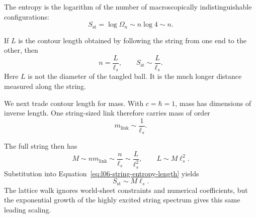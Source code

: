 The entropy is the logarithm of the number of macroscopically indistinguishable configurations:
\begin{equation}
S_{\mathrm{st}}=\log\Omega_n\sim n\log4\sim n.
\label{eq:l06-string-entropy-n}
\end{equation}

\begin{classroomqa}
\end{classroomqa}

If \(L\) is the contour length obtained by following the string from one end to the other, then
\begin{equation}
n=\frac{L}{\ell_s},
\qquad
S_{\mathrm{st}}\sim\frac{L}{\ell_s}.
\label{eq:l06-string-entropy-length}
\end{equation}
Here \(L\) is not the diameter of the tangled ball. It is the much longer distance measured along the string.

We next trade contour length for mass. With \(c=\hbar=1\), mass has dimensions of inverse length. One string-sized link therefore carries mass of order
\begin{equation}
m_{\mathrm{link}}\sim\frac{1}{\ell_s}.
\label{eq:l06-link-mass}
\end{equation}

\begin{classroomqa}
\end{classroomqa}

The full string then has
\begin{equation}
M\sim n m_{\mathrm{link}}
\sim\frac{n}{\ell_s}
\sim\frac{L}{\ell_s^2},
\qquad
L\sim M\ell_s^2.
\label{eq:l06-string-mass}
\end{equation}
Substitution into Equation~\eqref{eq:l06-string-entropy-length} yields
\begin{equation}
S_{\mathrm{st}}\sim M\ell_s.
\label{eq:l06-string-entropy-mass}
\end{equation}
The lattice walk ignores world-sheet constraints and numerical coefficients, but the exponential growth of the highly excited string spectrum gives this same leading scaling.

